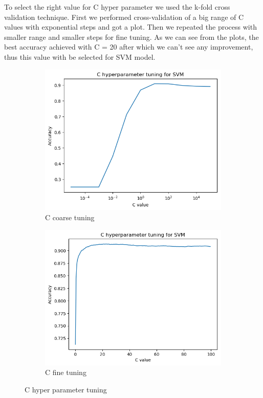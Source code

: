 \documentclass[12pt]{article}
\begin{document}
To select the right value for C hyper parameter we used the k-fold cross validation technique. First we performed cross-validation of a big range of C values with exponential steps and got a plot. Then we repeated the process with smaller range and smaller steps for fine tuning. As we can see from the plots, the best accuracy achieved with C = 20 after which we can't see any improvement, thus this value with be selected for SVM model.

\begin{figure}[h]
\centering
\begin{subfigure}{.5\textwidth}
  \centering
  \includegraphics[width=.6\linewidth]{Cross_valid_plots/SVM_C_hyper_fig_coarse.png}
  \caption{C coarse tuning}
  \label{fig:sub1}
\end{subfigure}%
\begin{subfigure}{.5\textwidth}
  \centering
  \includegraphics[width=.6\linewidth]{Cross_valid_plots/SVM_C_hyper_fig_fine.png}
  \caption{C fine tuning}
  \label{fig:sub2}
\end{subfigure}
\caption{C hyper parameter tuning}
\label{fig:test}
\end{figure}
 
\newpage
\end{document}

